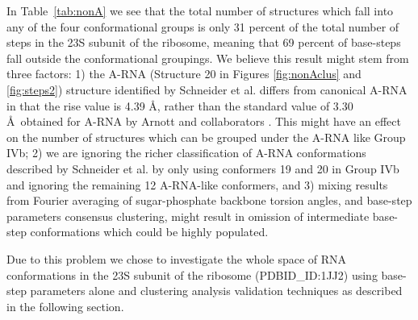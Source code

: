 In  Table~\ref{tab:nonA} we see  that the  total number  of structures
which  fall into  any of  the four  conformational groups  is  only 31
percent  of the  total  number of  steps  in the  23S  subunit of  the
ribosome,  meaning that  69  percent of  base-steps  fall outside  the
conformational groupings. We believe this result might stem from three
factors: 1) the A-RNA  (Structure 20 in Figures \ref{fig:nonAclus} and
\ref{fig:steps2})  structure identified by  Schneider et  al.  differs
from canonical A-RNA  in that the rise value is  4.39 \AA, rather than
the  standard value  of  3.30  \AA~obtained for  A-RNA  by Arnott  and
collaborators  \cite{arnott1973}.  This  might have  an effect  on the
number of structures  which can be grouped under  the A-RNA like Group
IVb;  2)   we  are  ignoring   the  richer  classification   of  A-RNA
conformations described  by Schneider et  al.  \cite{schneider2004} by
only  using  conformers  19 and  20  in  Group  IVb and  ignoring  the
remaining 12 A-RNA-like conformers, and 3) mixing results from Fourier
averaging  of sugar-phosphate backbone  torsion angles,  and base-step
parameters   consensus  clustering,  might   result  in   omission  of
intermediate base-step conformations which could be highly populated.

Due to this  problem we chose to investigate the  whole space of RNA
conformations  in the  23S  subunit of  the ribosome  (PDBID\_ID:1JJ2)
using  base-step parameters alone  and clustering  analysis validation
techniques as described in the following section.


